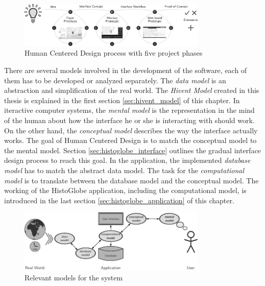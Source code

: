 \begin{figure}[H]
  \centering
  \includegraphics[width=0.8\textwidth]{graphics/development/hcd}
  \caption{Human Centered Design process with five project phases}
  \label{fig:hcd}
\end{figure}

There are several models involved in the development of the software, each of them has to be developed or analyzed separately. The \emph{data model} is an abstraction and simplification of the real world. The \emph{Hivent Model} created in this thesis is explained in the first section \ref{sec:hivent_model} of this chapter. In iteractive computer systems, the \emph{mental model} is the representation in the mind of the human about how the interface he or she is interacting with should work. On the other hand, the \emph{conceptual model} describes the way the interface actually works. The goal of Human Centered Design is to match the conceptual model to the mental model. Section \ref{sec:histoglobe_interface} outlines the gradual interface design process to reach this goal. In the application, the implemented \emph{database model} has to match the abstract data model. The task for the \emph{computational model} is to translate between the database model and the conceptual model. The working of the HistoGlobe application, including the computational model, is introduced in the last section \ref{sec:histoglobe_application} of this chapter.

\begin{figure}[H]
  \vspace{1em}
  \centering
  \includegraphics[width=0.8\textwidth]{graphics/development/models}
  \caption{Relevant models for the system}
  \label{fig:models}
\end{figure}

